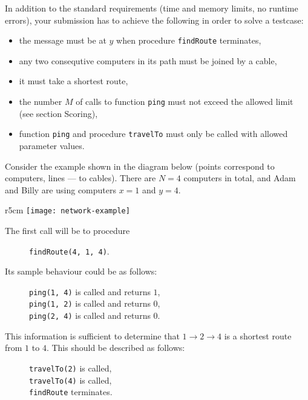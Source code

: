 \documentclass{boi2014}
\newcommand{\method}[1]{{\tt #1}}
\begin{document}
    In addition to the standard requirements (time and memory
    limits, no runtime errors), your submission has to achieve the following
    in order to solve a testcase:

    \begin{itemize}
        \item the message must be at $y$ when procedure \method{findRoute}
            terminates,
        \item any two consequtive computers in its path must be joined
            by a cable,
        \item it must take a shortest route,
        \item the number $M$ of calls to function \method{ping} must not
            exceed the allowed limit (see section Scoring),
        \item function \method{ping} and procedure \method{travelTo} must
            only be called with allowed parameter values.
    \end{itemize}

    \Example

    Consider the example shown in the diagram below (points correspond to
    computers, lines --- to cables). There are $N = 4$ computers in total,
    and Adam and Billy are using computers $x = 1$ and $y = 4$.

    \begin{wrapfigure}[1]{r}{5cm}
        \texttt{[image: network-example]}
    \end{wrapfigure}

    The first call will be to procedure
    \begin{figure}[H]
        \centering
        \method{findRoute(4, 1, 4)}.
    \end{figure}

    Its sample behaviour could be as follows:

    \begin{figure}[H]
        \centering
        \method{ping(1, 4)} is called and returns $1$, \\
        \method{ping(1, 2)} is called and returns $0$, \\
        \method{ping(2, 4)} is called and returns $0$.
    \end{figure}

    This information is sufficient to determine that $1 \to 2 \to 4$ is a
    shortest route from $1$ to $4$. This should be described as follows:

    \begin{figure}[H]
        \centering
        \method{travelTo(2)} is called, \\
        \method{travelTo(4)} is called, \\
        \method{findRoute} terminates.
    \end{figure}
\end{document}
